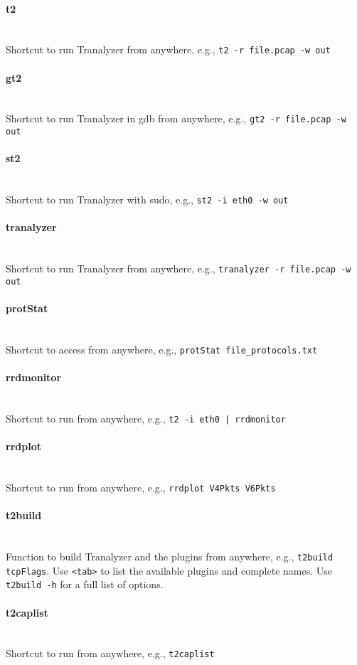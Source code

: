 \documentclass[documentation]{subfiles}
\begin{document}
\paragraph{t2}~\\
Shortcut to run Tranalyzer from anywhere, e.g., {\tt t2 -r file.pcap -w out}
\paragraph{gt2}~\\
Shortcut to run Tranalyzer in gdb from anywhere, e.g., {\tt gt2 -r file.pcap -w out}
\paragraph{st2}~\\
Shortcut to run Tranalyzer with sudo, e.g., {\tt st2 -i eth0 -w out}
\paragraph{tranalyzer}~\\
Shortcut to run Tranalyzer from anywhere, e.g., {\tt tranalyzer -r file.pcap -w out}
\paragraph{protStat}~\\
Shortcut to access {\tt{}} from anywhere, e.g., {\tt protStat file\_protocols.txt}
\paragraph{rrdmonitor}~\\
Shortcut to run   from anywhere, e.g., {\tt t2 -i eth0 | rrdmonitor}
\paragraph{rrdplot}~\\
Shortcut to run   from anywhere, e.g., {\tt rrdplot V4Pkts V6Pkts}
\paragraph{t2build}~\\
Function to build Tranalyzer and the plugins from anywhere, e.g., {\tt t2build tcpFlags}.
Use {\tt <tab>} to list the available plugins and complete names.
Use {\tt t2build -h} for a full list of options.
\paragraph{t2caplist}~\\
Shortcut to run  from anywhere, e.g., {\tt t2caplist}
\end{document}
